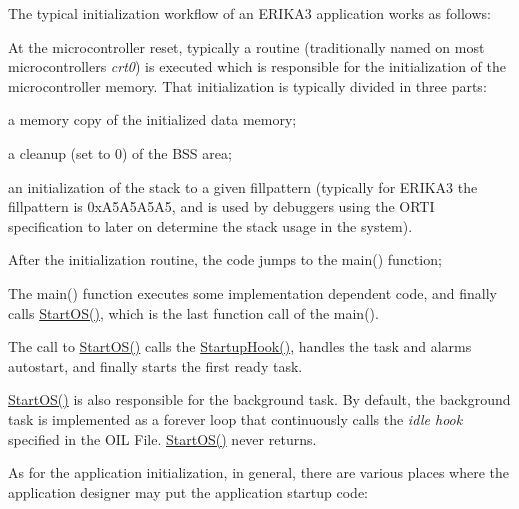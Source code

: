 The typical initialization workflow of an E\+R\+I\+K\+A3 application works as follows\+:


\begin{DoxyItemize}
\item At the microcontroller reset, typically a routine (traditionally named on most microcontrollers {\itshape crt0}) is executed which is responsible for the initialization of the microcontroller memory. That initialization is typically divided in three parts\+:
\begin{DoxyItemize}
\item a memory copy of the initialized data memory;
\item a cleanup (set to 0) of the B\+SS area;
\item an initialization of the stack to a given fillpattern (typically for E\+R\+I\+K\+A3 the fillpattern is 0x\+A5\+A5\+A5\+A5, and is used by debuggers using the O\+R\+TI specification to later on determine the stack usage in the system).
\end{DoxyItemize}
\item After the initialization routine, the code jumps to the main() function;
\item The main() function executes some implementation dependent code, and finally calls \mbox{\hyperlink{group__primitives-startup_ga5fb8a3c5837da7854c4da9972cefda96}{Start\+O\+S()}}, which is the last function call of the main().
\item The call to \mbox{\hyperlink{group__primitives-startup_ga5fb8a3c5837da7854c4da9972cefda96}{Start\+O\+S()}} calls the \mbox{\hyperlink{group__primitives-hook_ga5cb66285b5a4c562ec9c47bd9f7eb2b6}{Startup\+Hook()}}, handles the task and alarms autostart, and finally starts the first ready task.
\item \mbox{\hyperlink{group__primitives-startup_ga5fb8a3c5837da7854c4da9972cefda96}{Start\+O\+S()}} is also responsible for the background task. By default, the background task is implemented as a forever loop that continuously calls the {\itshape idle hook} specified in the O\+IL File. \mbox{\hyperlink{group__primitives-startup_ga5fb8a3c5837da7854c4da9972cefda96}{Start\+O\+S()}} never returns.
\end{DoxyItemize}

As for the application initialization, in general, there are various places where the application designer may put the application startup code\+:



